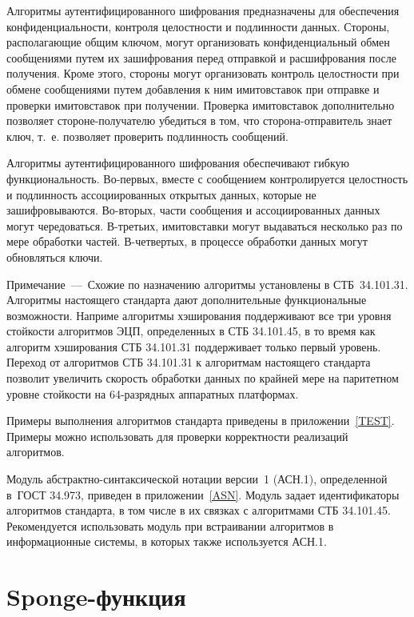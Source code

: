 Алгоритмы аутентифицированного шифрования предназначены для обеспечения 
конфиденциальности, контроля целостности и подлинности данных.
%
Стороны, располагающие общим ключом, могут организовать 
конфиденциальный обмен сообщениями путем их зашифрования 
перед отправкой и расшифрования после получения.
%
Кроме этого, стороны могут организовать контроль целостности при обмене 
сообщениями путем добавления к ним имитовставок при отправке 
и проверки имитовставок при получении.
%
Проверка имитовставок дополнительно позволяет стороне-получателю 
убедиться в том, что сторона-отправитель знает ключ,
т.~е. позволяет проверить подлинность сообщений.

Алгоритмы аутентифицированного шифрования обеспечивают гибкую функциональность.
%
Во-первых, вместе с сообщением контролируется целостность и подлинность 
ассоциированных открытых данных, которые не зашифровываются.
%
Во-вторых, части сообщения и ассоциированных данных могут чередоваться.
%
В-третьих, имитовставки могут выдаваться несколько раз по мере обработки 
частей.
%
В-четвертых, в процессе обработки данных могут обновляться ключи. 

\begin{note}
Примечание~---~Схожие по назначению алгоритмы установлены в СТБ~34.101.31. 
Алгоритмы настоящего стандарта дают дополнительные функциональные возможности.
Наприме алгоритмы хэширования поддерживают все три уровня стойкости 
алгоритмов ЭЦП, определенных в СТБ 34.101.45, в то время как алгоритм 
хэширования СТБ 34.101.31 поддерживает только первый уровень.
%
Переход от алгоритмов СТБ 34.101.31 к алгоритмам настоящего стандарта позволит 
увеличить скорость обработки данных по крайней мере на паритетном уровне 
стойкости на 64-разрядных аппаратных платформах.
\end{note}

Примеры выполнения алгоритмов стандарта приведены в приложении~\ref{TEST}.
Примеры можно использовать для проверки корректности реализаций 
алгоритмов.

Модуль абстрактно-синтаксической нотации версии~1 (АСН.1), определенной 
в~ГОСТ 34.973, приведен в приложении~\ref{ASN}. Модуль задает идентификаторы 
алгоритмов стандарта, в том числе в их связках с алгоритмами СТБ 34.101.45.
%
Рекомендуется использовать модуль при встраивании алгоритмов в информационные
системы, в которых также используется АСН.1.

\section{Sponge-функция}\label{COMMON.F}

